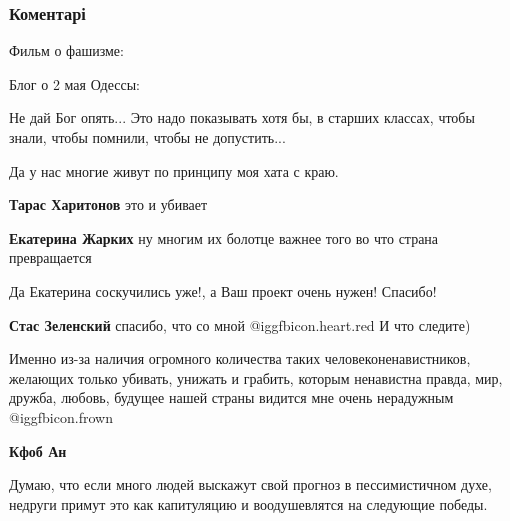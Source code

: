  
 
 
 
 
\subsubsection{Коментарі}

\begin{itemize} %

Фильм о фашизме:

\zzrule

Блог о 2 мая Одессы: 

\zzrule

\begin{itemize} %
Не дай Бог опять... Это надо показывать хотя бы, в старших классах, чтобы знали, чтобы помнили, чтобы не допустить...
\end{itemize} %

Да у нас многие живут по принципу моя хата с краю.

\textbf{Тарас Харитонов} это и убивает

\textbf{Екатерина Жарких} ну многим их болотце важнее того во что страна превращается


Да Екатерина соскучились уже!, а Ваш проект очень нужен! Спасибо!

\textbf{Стас Зеленский} спасибо, что со мной @igg{fbicon.heart.red}
И что следите)


Именно из-за наличия огромного количества таких человеконенавистников, желающих
только убивать, унижать и грабить, которым ненавистна правда, мир, дружба,
любовь, будущее нашей страны видится мне очень нерадужным  @igg{fbicon.frown} 

\begin{itemize} %
\textbf{Кфоб Ан} 

Думаю, что если много людей выскажут свой прогноз в пессимистичном духе,
недруги примут это как капитуляцию и воодушевлятся на следующие победы.


\end{itemize}
\end{itemize}
